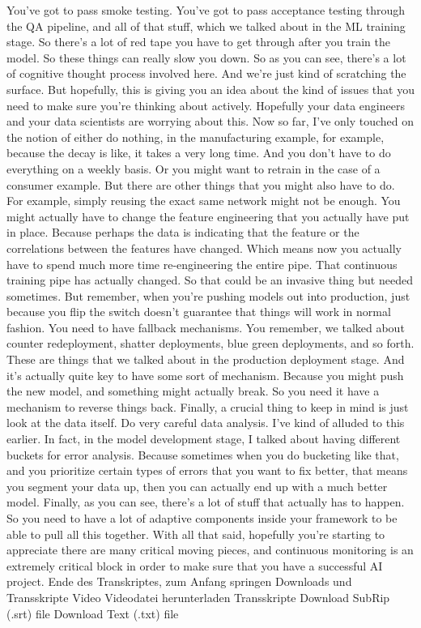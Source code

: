 {{{{{{{{     You've got to pass smoke testing.
     You've got to pass acceptance testing through the QA pipeline,
     and all of that stuff, which we talked about in the ML training stage.
     So there's a lot of red tape you have to get through after you train the model.
     So these things can really slow you down.
     So as you can see, there's a lot of cognitive thought
     process involved here.
     And we're just kind of scratching the surface.
     But hopefully, this is giving you an idea
     about the kind of issues that you need to make
     sure you're thinking about actively.
     Hopefully your data engineers and your data scientists
     are worrying about this.
     Now so far, I've only touched on the notion
     of either do nothing, in the manufacturing example, for example,
     because the decay is like, it takes a very long time.
     And you don't have to do everything on a weekly basis.
     Or you might want to retrain in the case of a consumer example.
     But there are other things that you might also have to do.
     For example, simply reusing the exact same network might not be enough.
     You might actually have to change the feature engineering that you actually
     have put in place.
     Because perhaps the data is indicating that the feature or the correlations
     between the features have changed.
     Which means now you actually have to spend much more time
     re-engineering the entire pipe.
     That continuous training pipe has actually changed.
     So that could be an invasive thing but needed sometimes.
     But remember, when you're pushing models out into production,
     just because you flip the switch doesn't guarantee that things
     will work in normal fashion.
     You need to have fallback mechanisms.
     You remember, we talked about counter redeployment, shatter deployments,
     blue green deployments, and so forth.
     These are things that we talked about in the production deployment stage.
     And it's actually quite key to have some sort of mechanism.
     Because you might push the new model, and something might actually break.
     So you need it have a mechanism to reverse things back.
     Finally, a crucial thing to keep in mind is just look at the data itself.
     Do very careful data analysis.
     I've kind of alluded to this earlier.
     In fact, in the model development stage, I
     talked about having different buckets for error analysis.
     Because sometimes when you do bucketing like that,
     and you prioritize certain types of errors that you want to fix better,
     that means you segment your data up, then you
     can actually end up with a much better model.
     Finally, as you can see, there's a lot of stuff that actually has to happen.
     So you need to have a lot of adaptive components inside your framework
     to be able to pull all this together.
     With all that said, hopefully you're starting
     to appreciate there are many critical moving pieces,
     and continuous monitoring is an extremely critical block
     in order to make sure that you have a successful AI project.
     Ende des Transkriptes, zum Anfang springen
     Downloads und Transskripte
     Video
     Videodatei herunterladen
     Transskripte
     Download SubRip (.srt) file
     Download Text (.txt) file
 
}}}}}}}}
